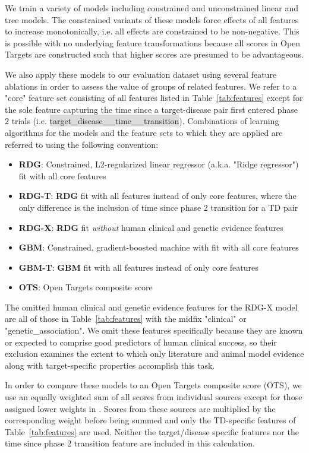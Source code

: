 \documentclass{article}
\begin{document}
We train a variety of models including constrained and unconstrained linear and tree models. The constrained variants of these models force effects of all features to increase monotonically, i.e. all effects are constrained to be non-negative. This is possible with no underlying feature transformations because all scores in Open Targets are constructed such that higher scores are presumed to be advantageous. 

We also apply these models to our evaluation dataset using several feature ablations in order to assess the value of groups of related features. We refer to a "core" feature set consisting of all features listed in Table~\ref{tab:features} except for the sole feature capturing the time since a target-disease pair first entered phase 2 trials (i.e. \colorbox{Gainsboro}{target\_disease\_\_time\_\_transition}). Combinations of learning algorithms for the models and the feature sets to which they are applied are referred to using the following convention:

\begin{itemize}
  \item \textbf{RDG}: Constrained, L2-regularized linear regressor (a.k.a. "Ridge regressor") fit with all core features
  \item \textbf{RDG-T}: \textbf{RDG} fit with all features instead of only core features, where the only difference is the inclusion of time since phase 2 transition for a TD pair
  \item \textbf{RDG-X}: \textbf{RDG} fit \textit{without} human clinical and genetic evidence features
  \item \textbf{GBM}: Constrained, gradient-boosted machine with fit with all core features
  \item \textbf{GBM-T}: \textbf{GBM} fit with all features instead of only core features
  \item \textbf{OTS}: Open Targets composite score
\end{itemize}

The omitted human clinical and genetic evidence features for the RDG-X model are all of those in Table~\ref{tab:features} with the midfix "clinical" or "genetic\_association". We omit these features specifically because they are known or expected to comprise good predictors of human clinical success, so their exclusion examines the extent to which only literature and animal model evidence along with target-specific properties accomplish this task.

In order to compare these models to an Open Targets composite score (OTS), we use an equally weighted sum of all scores from individual sources except for those assigned lower weights in \cite{OTweights}. Scores from these sources are multiplied by the corresponding weight before being summed and only the TD-specific features of Table~\ref{tab:features} are used. Neither the target/disease specific features nor the time since phase 2 transition feature are included in this calculation.
\end{document}

